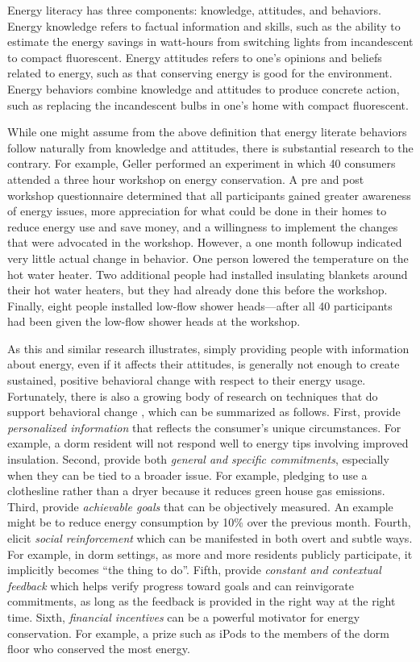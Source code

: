 \documentclass[11pt]{article}
\begin{document}
Energy literacy \cite{DeWaters09b, DeWaters09} has three components:
knowledge, attitudes, and behaviors. Energy knowledge refers to factual 
information and skills, such as the ability to estimate the energy savings
in watt-hours from switching lights from incandescent to compact
fluorescent.   Energy attitudes refers to one's opinions and beliefs
related to energy, such as that conserving energy is good for
the environment.   Energy behaviors combine knowledge and attitudes to
produce concrete action, such as replacing the incandescent bulbs in one's
home with compact fluorescent. 

While one might assume from the above definition that energy literate
behaviors follow naturally from knowledge and attitudes, there is
substantial research to the contrary.  For example, Geller \cite{Geller81}
performed an experiment in which 40 consumers attended a three hour
workshop on energy conservation.  A pre and post workshop questionnaire
determined that all participants gained greater awareness of energy issues,
more appreciation for what could be done in their homes to reduce energy
use and save money, and a willingness to implement the changes that were
advocated in the workshop. However, a one month followup indicated very
little actual change in behavior. One person lowered the temperature on the
hot water heater. Two additional people had installed insulating blankets
around their hot water heaters, but they had already done this before the
workshop. Finally, eight people installed low-flow shower heads---after all
40 participants had been given the low-flow shower heads at the workshop.

As this and similar research illustrates, simply providing people with
information about energy, even if it affects their attitudes, is generally
not enough to create sustained, positive behavioral change with respect to
their energy usage.  Fortunately, there is also a growing body of research
on techniques that do support behavioral change
\cite{Becker78,Darby06,Faruqui09,Houwelingen89,Peterson07,Peterson07a,Staats04,Vollink99},
which can be summarized as follows.  First, provide {\em personalized
  information} that reflects the consumer's unique circumstances.  For
example, a dorm resident will not respond well to energy tips involving
improved insulation.  Second, provide both {\em general and specific
  commitments}, especially when they can be tied to a broader issue. For
example, pledging to use a clothesline rather than a dryer because it
reduces green house gas emissions.  Third, provide {\em achievable goals}
that can be objectively measured.  An example might be to reduce energy
consumption by 10\% over the previous month.  Fourth, elicit {\em social
  reinforcement} which can be manifested in both overt and subtle ways.
For example, in dorm settings, as more and more residents publicly
participate, it implicitly becomes ``the thing to do''.  Fifth, provide
{\em constant and contextual feedback} which helps verify progress toward
goals and can reinvigorate commitments, as long as the feedback is provided
in the right way at the right time.  Sixth, {\em financial incentives} can
be a powerful motivator for energy conservation. For example, a prize such
as iPods to the members of the dorm floor who conserved the most energy.
\end{document}
